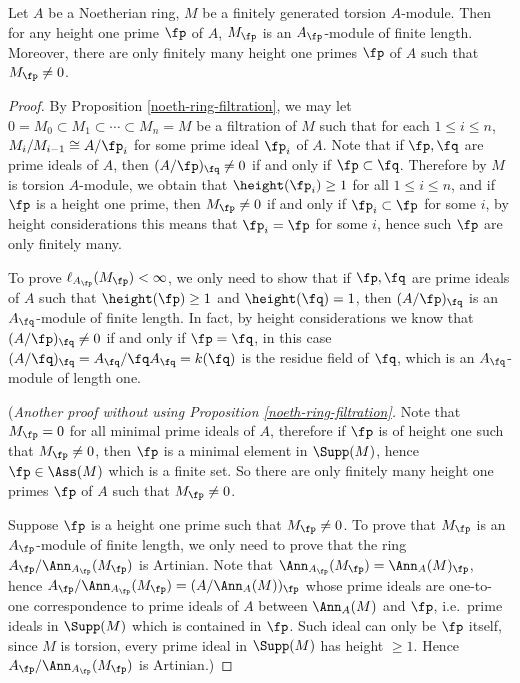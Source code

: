 \begin{prop}
\label{char-ideal-preliminary}
\leanok
Let $A$ be a Noetherian ring, $M$ be a
finitely generated torsion $A$-module.
Then for any height one prime $\fp$ of $A$,
$M_\fp$ is an $A_\fp$-module of finite length. Moreover, there are only finitely
many height one primes $\fp$ of $A$ such that $M_\fp\neq 0$.
\end{prop}

\begin{proof}
\leanok
By Proposition \ref{noeth-ring-filtration},
we may let $0=M_0\subset M_1\subset\cdots\subset M_n=M$ be a filtration of $M$
such that for each $1\leq i\leq n$,
$M_i/M_{i-1}\cong A/\fp_i$ for some prime ideal $\fp_i$ of $A$.
Note that if $\fp,\fq$ are prime ideals of $A$,
then $(A/\fp)_\fq\neq 0$ if and only if $\fp\subset\fq$.
Therefore by $M$ is torsion $A$-module, we obtain that $\height(\fp_i)\geq 1$
for all $1\leq i\leq n$,
and if $\fp$ is a height one prime, then $M_\fp\neq 0$
if and only if $\fp_i\subset\fp$ for some $i$,
by height considerations this means that $\fp_i=\fp$ for some $i$,
hence such $\fp$ are only finitely many.

To prove $\ell_{A_\fp}(M_\fp)<\infty$,
we only need to show that if $\fp,\fq$ are prime ideals of $A$
such that $\height(\fp)\geq 1$ and $\height(\fq)=1$,
then $(A/\fp)_\fq$ is an $A_\fq$-module of finite length.
In fact, by height considerations we know that $(A/\fp)_\fq\neq 0$
if and only if $\fp=\fq$, in this case $(A/\fq)_\fq=A_\fq/\fq A_\fq
=k(\fq)$ is the residue field of $\fq$, which is
an $A_\fq$-module of length one.

(\emph{Another proof without using Proposition \ref{noeth-ring-filtration}.}
Note that $M_\fp=0$ for all minimal prime ideals of $A$,
therefore if $\fp$ is of height one such that $M_\fp\neq 0$,
then $\fp$ is a minimal element in $\Supp(M)$, hence $\fp\in\Ass(M)$
which is a finite set.
So there are only finitely
many height one primes $\fp$ of $A$ such that $M_\fp\neq 0$.

Suppose $\fp$ is a height one prime such that $M_\fp\neq 0$.
To prove that $M_\fp$ is an $A_\fp$-module of finite length,
we only need to prove that the ring $A_\fp/\Ann_{A_\fp}(M_\fp)$
is Artinian. Note that $\Ann_{A_\fp}(M_\fp)=\Ann_A(M)_\fp$,
hence $A_\fp/\Ann_{A_\fp}(M_\fp)=(A/\Ann_A(M))_\fp$
whose prime ideals are one-to-one correspondence to prime ideals
of $A$ between $\Ann_A(M)$ and $\fp$,
i.e.~prime ideals in $\Supp(M)$ which is contained in $\fp$.
Such ideal can only be $\fp$ itself,
since $M$ is torsion, every prime ideal in $\Supp(M)$ has height $\geq 1$.
Hence $A_\fp/\Ann_{A_\fp}(M_\fp)$
is Artinian.)
\end{proof}

